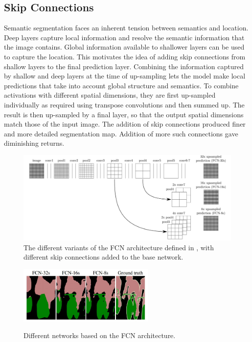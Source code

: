 \documentclass[12pt, a4paper]{report}
\begin{document}
\subsection{Skip Connections}
Semantic segmentation faces an inherent tension between semantics and location. Deep layers capture local information and resolve the semantic information that the image contains. Global information available to shallower layers can be used to capture the location. This motivates the idea of adding skip connections from shallow layers to the final prediction layer. Combining the information captured by shallow and deep layers at the time of up-sampling lets the model make local predictions that take into account global structure and semantics. To combine activations with different spatial dimensions, they are first up-sampled individually as required using transpose convolutions and then summed up. The result is then up-sampled by a final layer, so that the output spatial dimensions match those of the input image. The addition of skip connections produced finer and more detailed segmentation map. Addition of more such connections gave diminishing returns.\cite{long2015fully}
\begin{figure}[h]
\centering
\includegraphics[width=\textwidth]{fcn2.jpg}
\caption{The different variants of the FCN architecture defined in \cite{long2015fully}, with different skip connections added to the base network.}
\end{figure}
\begin{figure}[h]
\centering
\includegraphics[width=0.6\textwidth]{fcn3.jpg}
\caption{Different networks based on the FCN architecture.}
\cite{long2015fully}
\end{figure}
\end{document}
